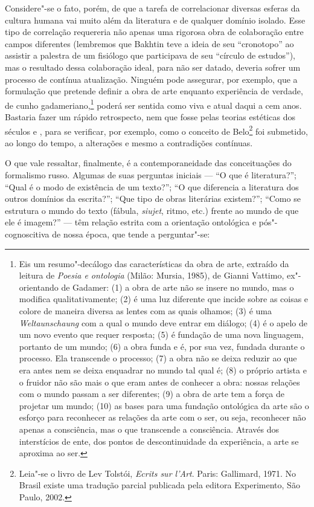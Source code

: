 {Considere"-se o fato, porém, de que a tarefa de correlacionar diversas
esferas da cultura humana vai muito além da literatura e de qualquer
domínio isolado. Esse tipo de correlação requereria não apenas uma
rigorosa obra de colaboração entre campos diferentes (lembremos que Bakhtin teve a ideia de seu ``cronotopo'' ao
assistir a palestra de um fisiólogo que participava de seu ``círculo de
estudos''), mas o resultado dessa colaboração ideal, para não ser
datado, deveria sofrer um processo de contínua atualização. Ninguém pode
assegurar, por exemplo, que a formulação que pretende definir a obra de
arte enquanto experiência de verdade, de cunho
gadameriano,\footnote{Eis 
um resumo"-decálogo das características da obra de arte, extraído da 
leitura de \emph{Poesia e ontologia} (Milão: Mursia, 1985), de Gianni 
Vattimo, ex"-orientando de Gadamer: (1) a obra de arte não se insere 
no mundo, mas o modifica qualitativamente; (2) é uma luz diferente
 que incide sobre as coisas e colore de maneira diversa as lentes com 
as quais olhamos; (3) é uma \emph{Weltaunschaung} com a qual o mundo
 deve entrar em diálogo; (4) é o apelo de um novo evento que requer 
resposta; (5) é fundação de uma nova linguagem, portanto de um mundo; 
(6) a obra funda e é, por sua vez, fundada durante o processo. Ela
 transcende o processo; (7) a obra não se deixa reduzir ao que era 
antes nem se deixa enquadrar no mundo tal qual é;
(8) o próprio artista e o fruidor não são mais o que eram antes
 de conhecer a obra: nossas relações com o mundo passam a ser 
diferentes; (9) a obra de arte tem a força de projetar um mundo; (10)
 as bases para uma fundação ontológica da arte são o esforço para
 reconhecer as relações da arte com o ser, ou seja, reconhecer não 
apenas a consciência, mas o que transcende a consciência. Através dos 
interstícios de ente, dos pontos de descontinuidade da experiência, a 
arte se aproxima ao ser.} poderá ser sentida como viva e atual daqui 
a cem anos. Bastaria fazer um rápido retrospecto, nem que fosse pelas
 teorias estéticas dos séculos  e , para se 
verificar, por exemplo, como o conceito de Belo\footnote{Leia"-se o 
livro de Lev Tolstói, \emph{Ecrits sur l'Art}. Paris: Gallimard, 1971.
 No Brasil existe uma tradução parcial publicada pela editora 
Experimento, São Paulo, 2002.} foi submetido, ao longo do tempo, a 
alterações e mesmo a contradições contínuas.

O que vale ressaltar, finalmente, é a contemporaneidade das
conceituações do formalismo russo. Algumas de suas perguntas iniciais
--- ``O que é literatura?''; ``Qual é o modo de existência de um texto?'';
``O que diferencia a literatura dos outros domínios da escrita?''; ``Que
tipo de obras literárias existem?''; ``Como se estrutura o mundo do
texto (fábula, \emph{siujet}, ritmo, etc.) frente ao mundo de que ele é
imagem?'' --- têm relação estrita com a orientação ontológica e
pós"-cognoscitiva de nossa época, que tende a perguntar"-se:

}
